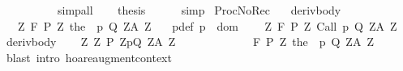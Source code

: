 \begin{isabellebody}
\ \ \ \ \ \ \ \ \ \ simp{\isacharunderscore}all{\isacharparenright}\isanewline
\ \ \isamarkupfalse%
\ {\isacharquery}thesis\isanewline
\ \ \ \ \isamarkupfalse%
\ simp\isanewline
{}\isamarkupfalse%
%
\endisatagproof
{\isafoldproof}%
%
\isadelimproof
\isanewline
%
\endisadelimproof
\isanewline
{}\isamarkupfalse%
\ ProcNoRec{}{\isacharcolon}\isanewline
\ \ \ deriv{\isacharunderscore}body{\isacharcolon}\ \ \isanewline
\ \ \ {\isachardoublequoteopen}{\isasymforall}Z{\isachardot}\ {\isasymGamma}{\isacharcomma}{\isasymTheta}{\isasymturnstile}\isactrlbsub {\isacharslash}F\isactrlesub \ {\isacharparenleft}P\ Z{\isacharparenright}\ {\isacharparenleft}the\ {\isacharparenleft}{\isasymGamma}\ p{\isacharparenright}{\isacharparenright}\ {\isacharparenleft}Q\ Z{\isacharparenright}{\isacharcomma}{\isacharparenleft}A\ Z{\isacharparenright}{\isachardoublequoteclose}\isanewline
\ \ \ p{\isacharunderscore}def{\isacharcolon}\ {\isachardoublequoteopen}p\ {\isasymin}\ dom\ {\isasymGamma}{\isachardoublequoteclose}\isanewline
\ \ \ {\isachardoublequoteopen}{\isasymforall}Z{\isachardot}\ {\isasymGamma}{\isacharcomma}{\isasymTheta}{\isasymturnstile}\isactrlbsub {\isacharslash}F\isactrlesub \ {\isacharparenleft}P\ Z{\isacharparenright}\ Call\ p\ {\isacharparenleft}Q\ Z{\isacharparenright}{\isacharcomma}{\isacharparenleft}A\ Z{\isacharparenright}{\isachardoublequoteclose}\isanewline
%
\isadelimproof
%
\endisadelimproof
%
\isatagproof
{}\isamarkupfalse%
\ {\isacharminus}\isanewline
{}\isamarkupfalse%
\ deriv{\isacharunderscore}body\isanewline
\ \ \isamarkupfalse%
\ {\isachardoublequoteopen}{\isasymforall}Z{\isachardot}\ {\isasymGamma}{\isacharcomma}{\isasymTheta}{\isasymunion}{\isacharparenleft}{\isasymUnion}Z{\isachardot}\ {\isacharbraceleft}{\isacharparenleft}P\ Z{\isacharcomma}p{\isacharcomma}Q\ Z{\isacharcomma}A\ Z{\isacharparenright}{\isacharbraceright}{\isacharparenright}\isanewline
\ \ \ \ \ \ \ \ \ \ \ \ \ {\isasymturnstile}\isactrlbsub {\isacharslash}F\isactrlesub \ {\isacharparenleft}P\ Z{\isacharparenright}\ {\isacharparenleft}the\ {\isacharparenleft}{\isasymGamma}\ p{\isacharparenright}{\isacharparenright}\ {\isacharparenleft}Q\ Z{\isacharparenright}{\isacharcomma}{\isacharparenleft}A\ Z{\isacharparenright}{\isachardoublequoteclose}\isanewline
\ \ \ \ \isamarkupfalse%
\ {\isacharparenleft}blast\ intro{\isacharcolon}\ hoare{\isacharunderscore}augment{\isacharunderscore}context{\isacharparenright}\isanewline

\end{isabellebody}
